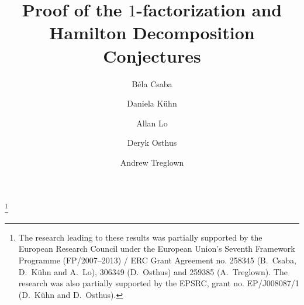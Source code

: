 \documentclass{memo-l}
\numberwithin{section}{chapter}
\numberwithin{equation}{section}
\numberwithin{firstthm}{section}
\numberwithin{figure}{section}
\begin{document}
\frontmatter

\title[Proof of the $1$-factorization \& Hamilton Decomposition Conjectures]{Proof of the $1$-factorization and Hamilton Decomposition Conjectures}


\author{B\'ela Csaba}
\address{Bolyai Institute,
University of Szeged,
H-6720 Szeged, Aradi \break v\'ertan\'uk tere 1.
Hungary}

\author{Daniela K\"uhn}
\address{School of Mathematics
University of Birmingham
Edgbaston
Birmingham 
B15 2TT
UK}




\author{Allan Lo}
\address{School of Mathematics
University of Birmingham
Edgbaston
Birmingham 
B15 2TT
UK}

\author{Deryk Osthus}
\address{School of Mathematics
University of Birmingham
Edgbaston
Birmingham 
B15 2TT
UK}

\author{Andrew Treglown}
\address{School of Mathematics
University of Birmingham
Edgbaston
Birmingham 
B15 2TT
UK}
\thanks{The research leading to these results was partially supported by the  European Research Council under the European Union's Seventh Framework Programme (FP/2007--2013) / ERC Grant Agreement no. 258345 (B.~Csaba, D.~K\"uhn and A.~Lo), 306349 (D.~Osthus) and 259385 (A.~Treglown). The research was also partially supported by the EPSRC, grant no. EP/J008087/1 (D.~K\"uhn and D.~Osthus).}


\date{}



\end{document}
